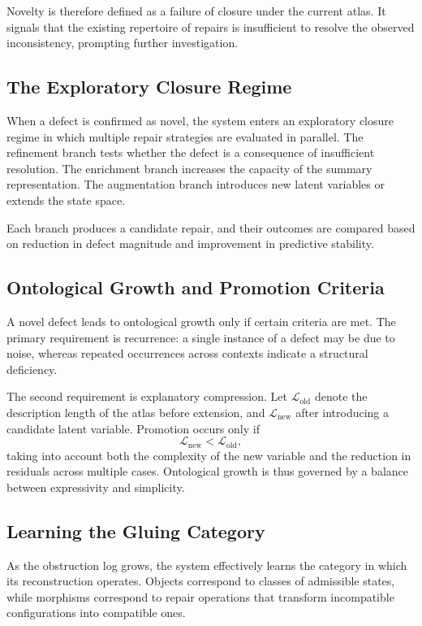 \documentclass[12pt, oneside]{article}
\begin{document}
Novelty is therefore defined as a failure of closure under the current atlas. It signals that the existing repertoire of repairs is insufficient to resolve the observed inconsistency, prompting further investigation.

\subsection{The Exploratory Closure Regime}

When a defect is confirmed as novel, the system enters an exploratory closure regime in which multiple repair strategies are evaluated in parallel. The refinement branch tests whether the defect is a consequence of insufficient resolution. The enrichment branch increases the capacity of the summary representation. The augmentation branch introduces new latent variables or extends the state space.

Each branch produces a candidate repair, and their outcomes are compared based on reduction in defect magnitude and improvement in predictive stability.

\subsection{Ontological Growth and Promotion Criteria}

A novel defect leads to ontological growth only if certain criteria are met. The primary requirement is recurrence: a single instance of a defect may be due to noise, whereas repeated occurrences across contexts indicate a structural deficiency.

The second requirement is explanatory compression. Let $\mathcal{L}_{\text{old}}$ denote the description length of the atlas before extension, and $\mathcal{L}_{\text{new}}$ after introducing a candidate latent variable. Promotion occurs only if
\[
\mathcal{L}_{\text{new}} < \mathcal{L}_{\text{old}},
\]
taking into account both the complexity of the new variable and the reduction in residuals across multiple cases. Ontological growth is thus governed by a balance between expressivity and simplicity.

\subsection{Learning the Gluing Category}

As the obstruction log grows, the system effectively learns the category in which its reconstruction operates. Objects correspond to classes of admissible states, while morphisms correspond to repair operations that transform incompatible configurations into compatible ones.
\end{document}
